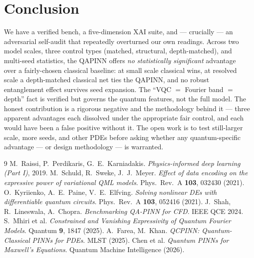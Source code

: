 \documentclass[11pt]{article}
\begin{document}
\section{Conclusion}
We have a verified bench, a five-dimension XAI suite, and --- crucially --- an
adversarial self-audit that repeatedly overturned our own readings. Across two model
scales, three control types (matched, structural, depth-matched), and multi-seed
statistics, the QAPINN offers \emph{no statistically significant} advantage over a
fairly-chosen classical baseline: at small scale classical wins, at resolved scale a
depth-matched classical net ties the QAPINN, and no robust entanglement effect
survives seed expansion. The ``VQC $=$ Fourier band $=$ depth'' fact is verified but
governs the quantum features, not the full model. The honest contribution is a
rigorous negative and the methodology behind it --- three apparent advantages each
dissolved under the appropriate fair control, and each would have been a false
positive without it. The open work is to test still-larger scale, more seeds, and
other PDEs before asking whether any quantum-specific advantage --- or design
methodology --- is warranted.

\begin{thebibliography}{9}
\small
{} M.~Raissi, P.~Perdikaris, G.~E.~Karniadakis. \emph{Physics-informed deep learning (Part I)}, 2019.
 M.~Schuld, R.~Sweke, J.~J.~Meyer. \emph{Effect of data encoding on the expressive power of variational QML models}. Phys.\ Rev.\ A \textbf{103}, 032430 (2021).
 O.~Kyriienko, A.~E.~Paine, V.~E.~Elfving. \emph{Solving nonlinear DEs with differentiable quantum circuits}. Phys.\ Rev.\ A \textbf{103}, 052416 (2021).
 J.~Shah, R.~Lineswala, A.~Chopra. \emph{Benchmarking QA-PINN for CFD}. IEEE QCE 2024.
 S.~Mhiri et al. \emph{Constrained and Vanishing Expressivity of Quantum Fourier Models}. Quantum \textbf{9}, 1847 (2025).
 A.~Farea, M.~Khan. \emph{QCPINN: Quantum-Classical PINNs for PDEs}. MLST (2025).
 Chen et al. \emph{Quantum PINNs for Maxwell's Equations}. Quantum Machine Intelligence (2026).
\end{thebibliography}
\end{document}
